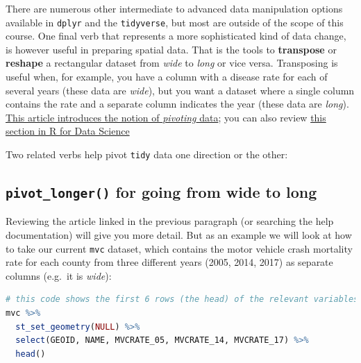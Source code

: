 \documentclass[
]{book}
\newcommand{\passthrough}[1]{#1}
\begin{document}
There are numerous other intermediate to advanced data manipulation options available in \passthrough{\lstinline!dplyr!} and the \passthrough{\lstinline!tidyverse!}, but most are outside of the scope of this course. One final verb that represents a more sophisticated kind of data change, is however useful in preparing spatial data. That is the tools to \textbf{transpose} or \textbf{reshape} a rectangular dataset from \emph{wide} to \emph{long} or vice versa. Transposing is useful when, for example, you have a column with a disease rate for each of several years (these data are \emph{wide}), but you want a dataset where a single column contains the rate and a separate column indicates the year (these data are \emph{long}). \href{https://tidyr.tidyverse.org/articles/pivot.html}{This article introduces the notion of \emph{pivoting} data}; you can also review \href{https://r4ds.had.co.nz/tidy-data.html\#pivoting}{this section in R for Data Science}

Two related verbs help pivot \passthrough{\lstinline!tidy!} data one direction or the other:

\hypertarget{pivot_longer-for-going-from-wide-to-long}{%
\subsection{\texorpdfstring{\texttt{pivot\_longer()} for going from wide to long}{pivot\_longer() for going from wide to long}}\label{pivot_longer-for-going-from-wide-to-long}}

Reviewing the article linked in the previous paragraph (or searching the help documentation) will give you more detail. But as an example we will look at how to take our current \passthrough{\lstinline!mvc!} dataset, which contains the motor vehicle crash mortality rate for each county from three different years (2005, 2014, 2017) as separate columns (e.g.~it is \emph{wide}):

\begin{lstlisting}[language=R]
# this code shows the first 6 rows (the head) of the relevant variables
mvc %>% 
  st_set_geometry(NULL) %>%
  select(GEOID, NAME, MVCRATE_05, MVCRATE_14, MVCRATE_17) %>%
  head()
\end{lstlisting}

 
  \providecommand{\huxb}[2]{\arrayrulecolor[RGB]{#1}\global\arrayrulewidth=#2pt}
  \providecommand{\huxvb}[2]{\color[RGB]{#1}\vrule width #2pt}
  \providecommand{\huxtpad}[1]{\rule{0pt}{#1}}
  \providecommand{\huxbpad}[1]{\rule[-#1]{0pt}{#1}}
\end{document}

